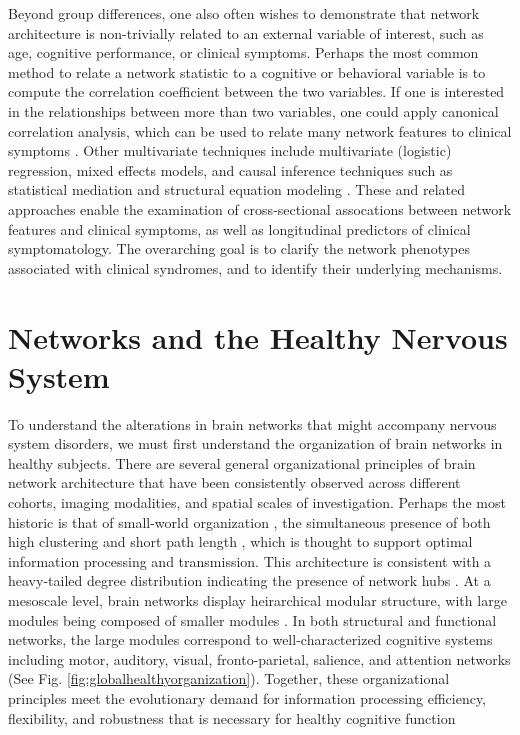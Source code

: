 \documentclass[12pt]{article}
\begin{document}
Beyond group differences, one also often wishes to demonstrate that network architecture is non-trivially related to an external variable of interest, such as age, cognitive performance, or clinical symptoms. Perhaps the most common method to relate a network statistic to a cognitive or behavioral variable is to compute the correlation coefficient between the two variables. If one is interested in the relationships between more than two variables, one could apply canonical correlation analysis, which can be used to relate many network features to clinical symptoms \cite{avants2010dementia}. Other multivariate techniques include multivariate (logistic) regression, mixed effects models, and causal inference techniques such as statistical mediation and structural equation modeling \cite{shipley2016cause}. These and related approaches enable the examination of cross-sectional assocations between network features and clinical symptoms, as well as longitudinal predictors of clinical symptomatology. The overarching goal is to clarify the network phenotypes associated with clinical syndromes, and to identify their underlying mechanisms.



\section*{Networks and the Healthy Nervous System}

To understand the alterations in brain networks that might accompany nervous system disorders, we must first understand the organization of brain networks in healthy subjects. There are several general organizational principles of brain network architecture that have been consistently observed across different cohorts, imaging modalities, and spatial scales of investigation. Perhaps the most historic is that of small-world organization \cite{bassett2006small,bassett2016small}, the simultaneous presence of both high clustering and short path length \cite{watts1998collective}, which is thought to support optimal information processing and transmission. This architecture is consistent with a heavy-tailed degree distribution indicating the presence of network hubs \cite{van2011rich}. At a mesoscale level, brain networks display heirarchical modular structure, with large modules being composed of smaller modules \cite{meunier2010modular,bassett2010efficient}. In both structural and functional networks, the large modules correspond to well-characterized cognitive systems including motor, auditory, visual, fronto-parietal, salience, and attention networks \cite{chen2008revealing,meunier2009age,power2011functional,yeo2011organization} (See Fig. \ref{fig:globalhealthyorganization}). Together, these organizational principles meet the evolutionary demand for information processing efficiency, flexibility, and robustness that is necessary for healthy cognitive function \cite{bullmore2012economy}
\end{document}
